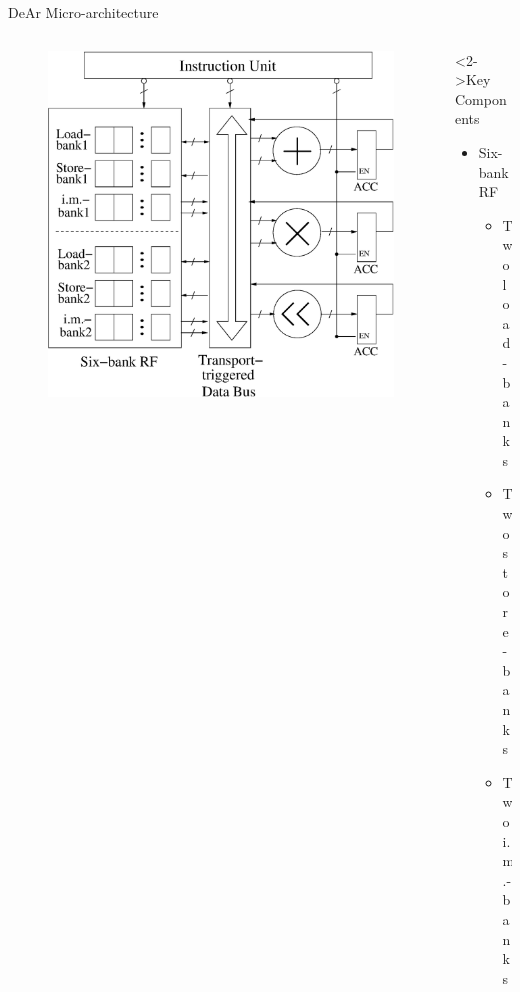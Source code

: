 \documentclass{beamer}
\begin{document}
\begin{CJK}{UTF8}{bkai}
            \begin{frame}{DeAr Micro-architecture}
                \begin{columns}
                    \begin{column}{0.6\textwidth}
                        \begin{figure}[!ht] 
                            \centering
                            \includegraphics[width=1.0\textwidth]{./figs/_micro.eps}
                        \end{figure}
                    \end{column}
                    \begin{column}{0.35\textwidth}
                        \begin{block}<2->{Key Components}
                            \begin{itemize}
                                \item <3->
                                {
                                    Six-bank RF
                                    \begin{itemize}
                                        \item Two load-banks
                                        \item Two store-banks
                                        \item Two i.m.-banks

\end{itemize}}
\end{itemize}
\end{block}
\end{column}
\end{columns}
\end{frame}
\end{CJK}
\end{document}
